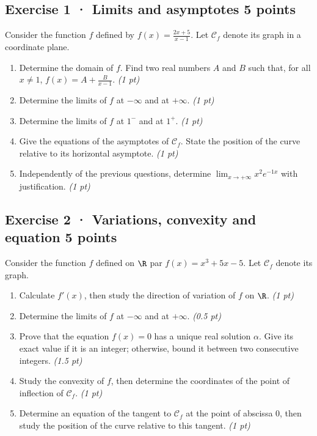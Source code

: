 \subsection*{Exercise 1 · Limits and asymptotes \hfill 5 points}Consider the function $f$ defined by $f(x)=\frac{2x+5}{x-1}$. Let $\mathcal C_f$ denote its graph in a coordinate plane.

\begin{enumerate}

\item Determine the domain of $f$. Find two real numbers $A$ and $B$ such that, for all $x\ne1$, $f(x)=A+\frac B{x-1}$. \hfill\textit{(1 pt)}

\item Determine the limits of $f$ at $-\infty$ and at $+\infty$. \hfill\textit{(1 pt)}

\item Determine the limits of $f$ at $1^-$ and at $1^+$. \hfill\textit{(1 pt)}

\item Give the equations of the asymptotes of $\mathcal C_f$. State the position of the curve relative to its horizontal asymptote. \hfill\textit{(1 pt)}

\item Independently of the previous questions, determine $\displaystyle\lim_{x\to+\infty}x^{2}e^{-1x}$ with justification. \hfill\textit{(1 pt)}

\end{enumerate}

\subsection*{Exercise 2 · Variations, convexity and equation \hfill 5 points}Consider the function $f$ defined on $\R$ par $f(x)=x^3+5x-5$. Let $\mathcal C_f$ denote its graph.

\begin{enumerate}

\item Calculate $f' (x)$, then study the direction of variation of $f$ on $\R$. \hfill\textit{(1 pt)}

\item Determine the limits of $f$ at $-\infty$ and at $+\infty$. \hfill\textit{(0.5 pt)}

\item Prove that the equation $f(x)=0$ has a unique real solution $\alpha$. Give its exact value if it is an integer; otherwise, bound it between two consecutive integers. \hfill\textit{(1.5 pt)}

\item Study the convexity of $f$, then determine the coordinates of the point of inflection of $\mathcal C_f$. \hfill\textit{(1 pt)}

\item Determine an equation of the tangent to $\mathcal C_f$ at the point of abscissa $0$, then study the position of the curve relative to this tangent. \hfill\textit{(1 pt)}

\end{enumerate}

